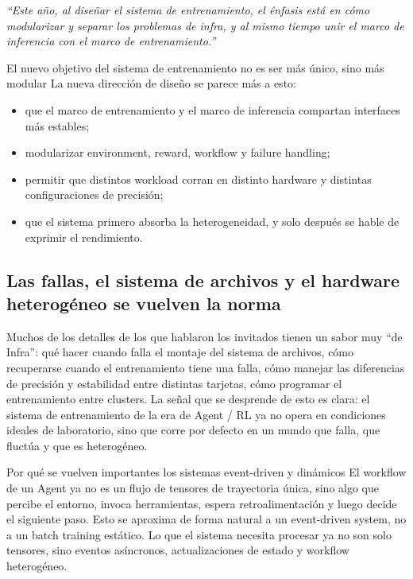 \documentclass[a4paper]{article}
\begin{document}
\textit{``Este año, al diseñar el sistema de entrenamiento, el énfasis está en cómo modularizar y separar los problemas de infra, y al mismo tiempo unir el marco de inferencia con el marco de entrenamiento.''}

\begin{importantbox}{El nuevo objetivo del sistema de entrenamiento no es ser más único, sino más modular}
La nueva dirección de diseño se parece más a esto:
\begin{itemize}
  \item que el marco de entrenamiento y el marco de inferencia compartan interfaces más estables;
  \item modularizar environment, reward, workflow y failure handling;
  \item permitir que distintos workload corran en distinto hardware y distintas configuraciones de precisión;
  \item que el sistema primero absorba la heterogeneidad, y solo después se hable de exprimir el rendimiento.
\end{itemize}
\end{importantbox}

\subsection{Las fallas, el sistema de archivos y el hardware heterogéneo se vuelven la norma}
Muchos de los detalles de los que hablaron los invitados tienen un sabor muy ``de Infra'': qué hacer cuando falla el montaje del sistema de archivos, cómo recuperarse cuando el entrenamiento tiene una falla, cómo manejar las diferencias de precisión y estabilidad entre distintas tarjetas, cómo programar el entrenamiento entre clusters. La señal que se desprende de esto es clara: el sistema de entrenamiento de la era de Agent / RL ya no opera en condiciones ideales de laboratorio, sino que corre por defecto en un mundo que falla, que fluctúa y que es heterogéneo.

\begin{knowledgebox}{Por qué se vuelven importantes los sistemas event-driven y dinámicos}
El workflow de un Agent ya no es un flujo de tensores de trayectoria única, sino algo que percibe el entorno, invoca herramientas, espera retroalimentación y luego decide el siguiente paso. Esto se aproxima de forma natural a un event-driven system, no a un batch training estático. Lo que el sistema necesita procesar ya no son solo tensores, sino eventos asíncronos, actualizaciones de estado y workflow heterogéneo.
\end{knowledgebox}
\end{document}
